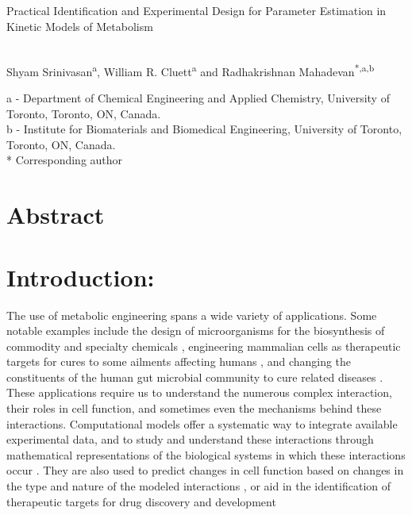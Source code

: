 \documentclass[10pt]{article}
\begin{document}
	\begin{center}
		\begin{Large}
			Practical Identification and Experimental Design for Parameter Estimation in Kinetic Models of Metabolism
		\end{Large}\\
		Shyam Srinivasan\textsuperscript{a}, William R. Cluett\textsuperscript{a} and Radhakrishnan Mahadevan\textsuperscript{*,a,b}\\
	\end{center}
	a - Department of Chemical Engineering and Applied Chemistry, University of Toronto, Toronto, ON, Canada.\\
	b - Institute for Biomaterials and Biomedical Engineering, University of Toronto, Toronto, ON, Canada.\\
	{*} Corresponding author
	\section*{Abstract}
	\section{Introduction:}
	The use of metabolic engineering spans a wide variety of applications. Some notable examples include the design of microorganisms for the biosynthesis of commodity and specialty chemicals \parencite{Andreozzi2016}, engineering mammalian cells as therapeutic targets for cures to some ailments affecting humans \parencite{DiFilippo2016,Apaolaza2017}, and changing the constituents of the human gut microbial community to cure related diseases \parencite{Zerfab2018}. These applications require us to understand the numerous complex interaction, their roles in cell function, and sometimes even the mechanisms behind these interactions. Computational models offer a systematic way to integrate available experimental data, and to study and understand these interactions through mathematical representations of the biological systems in which these interactions occur \parencite{Bordbar2014a,Saa2017}. They are also used to predict changes in cell function based on changes in the type and nature of the modeled interactions \parencite{Andreozzi2016}, or aid in the identification of therapeutic targets for drug discovery and development \parencite{Bordbar2015,Chandrasekaran2017}
	
\end{document}
